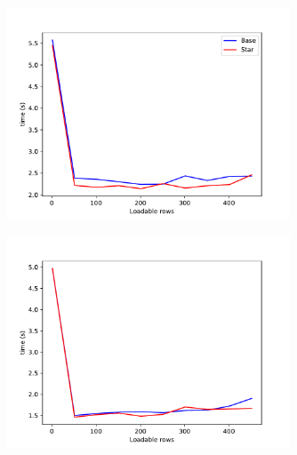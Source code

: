 \documentclass{beamer}
\begin{document}
\begin{frame}
    \begin{figure}
        \centering
        \includegraphics[width=0.75\textwidth]{loadable_rows_time_diff_rev.pdf}
        \label{fig:loadable_rows_time_diff_rev}
    \end{figure}
\end{frame}

\begin{frame}{}
    \begin{figure}
        \centering
        \includegraphics[width=0.75\textwidth]{loadable_rows_time_diff_shuffled.pdf}
        \label{fig:loadable_rows_time_diff_shuffled}
    \end{figure}
\end{frame}
\end{document}
